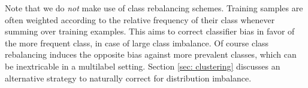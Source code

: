 Note that we do \textit{not} make use of class rebalancing schemes. Training samples are often weighted according to the relative frequency of their class whenever summing over training examples. This aims to correct classifier bias in favor of the more frequent class, in case of large class imbalance. Of course class rebalancing induces the opposite bias against more prevalent classes, which can be inextricable in a multilabel setting. Section \ref{sec: clustering} discusses an alternative strategy to naturally correct for distribution imbalance.